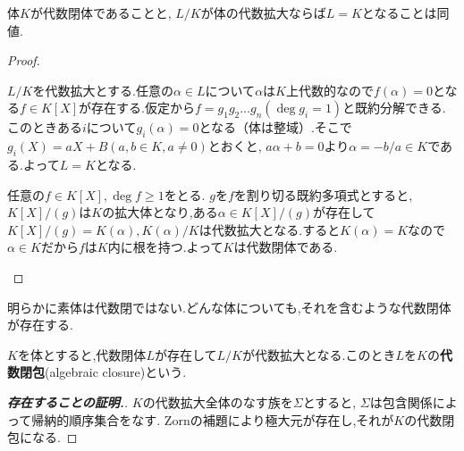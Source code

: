 \begin{prop}
	体$K$が代数閉体であることと, $L/K$が体の代数拡大ならば$L=K$となることは同値.
\end{prop}

\begin{proof}
	\begin{eqv}
		\item $L/K$を代数拡大とする.任意の$\alpha\in L$について$\alpha$は$K$上代数的なので$f(\alpha)=0$となる$f\in K[X]$が存在する.仮定から$f=g_1g_2\dots g_n (\deg g_i=1)$と既約分解できる.このときある$i$について$g_i(\alpha)=0$となる（体は整域）.そこで$g_i(X)=aX+B (a,b\in K, a\neq0)$とおくと, $a\alpha+b=0$より$\alpha=-b/a\in K$である.よって$L=K$となる.
	
	\item 任意の$f\in K[X],\deg f\geq1$をとる. $g$を$f$を割り切る既約多項式とすると, $K[X]/(g)$は$K$の拡大体となり,ある$\alpha\in K[X]/(g)$が存在して$K[X]/(g)=K(\alpha),K(\alpha)/K$は代数拡大となる.すると$K(\alpha)=K$なので$\alpha\in K$だから$f$は$K$内に根を持つ.よって$K$は代数閉体である.
	\end{eqv}
\end{proof}

明らかに素体は代数閉ではない.どんな体についても,それを含むような代数閉体が存在する.

\begin{defi}[代数閉包]
	$K$を体とすると,代数閉体$L$が存在して$L/K$が代数拡大となる.このとき$L$を$K$の\textbf{代数閉包}(algebraic closure)という.
\end{defi}

\begin{proof}[\textbf{存在することの証明.}]
	$K$の代数拡大全体のなす族を$\Sigma$とすると, $\Sigma$は包含関係によって帰納的順序集合をなす. Zornの補題により極大元が存在し,それが$K$の代数閉包になる.
\end{proof}